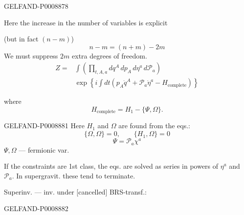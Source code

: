 \begin{GelfandAdjacentEvidence}{GELFAND-P000887}{8}


Here the increase in the number of variables is explicit

(but in fact $(n-m)$)
\begin{equation*}
n-m=(n+m)-2m
\end{equation*}
We must suppress $2m$ extra degrees of freedom.
\begin{equation*}
\begin{aligned}
Z={}&\int\left(\prod_{t,A,a}dq^A\,dp_A\,d\eta^a\,d\mathcal P_a\right)\\
&{}\exp\left\{i\int dt\left(p_A\dot q^A+\mathcal P_a\dot\eta^a-H_{\mathrm{complete}}\right)\right\}
\end{aligned}
\tag{8}
\end{equation*}
\end{GelfandAdjacentEvidence}


where
\begin{equation*}
H_{\mathrm{complete}}=H_1-\{\Psi,\Omega\}.
\tag{9}
\end{equation*}


\begin{GelfandAdjacentEvidence}{GELFAND-P000888}{1}
Here $H_1$ and $\Omega$ are found from the eqs.:
\begin{equation*}
\{\Omega,\Omega\}=0,\qquad \{H_1,\Omega\}=0
\tag{10}
\end{equation*}
\begin{equation*}
\Psi=\mathcal P_a\chi^a
\tag{11}
\end{equation*}
$\Psi,\Omega$ --- fermionic var.

If the constraints are 1st class, the eqs. are solved as series in powers of $\eta^a$ and $\mathcal P_a$. In supergravit. these tend to terminate.

Superinv. --- inv. under [cancelled] BRS-transf.:
\end{GelfandAdjacentEvidence}
\begin{GelfandAdjacentEvidence}{GELFAND-P000888}{2}


\end{GelfandAdjacentEvidence}

